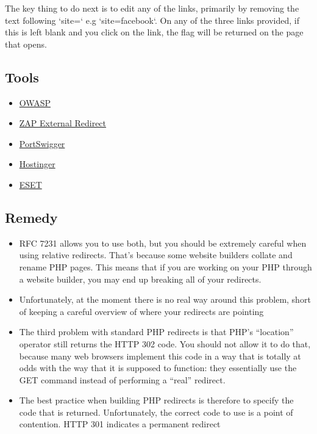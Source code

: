 The key thing to do next is to edit any of the links, primarily by removing the text following `site=` e.g `site=facebook`. On any of the three links provided, if this is left blank and you click on the link, the flag will be returned on the page that opens.


\subsection{Tools}

\begin{itemize}
    \item \href{https://cheatsheetseries.owasp.org/cheatsheets/Unvalidated_Redirects_and_Forwards_Cheat_Sheet.html}{OWASP}
    \item \href{https://www.zaproxy.org/docs/alerts/20019/}{ZAP External Redirect}
    \item \href{https://portswigger.net/kb/issues/00500100_open-redirection-reflected}{PortSwigger}
    \item \href{https://www.hostinger.com/tutorials/php-redirect}{Hostinger}
    \item \href{https://www.welivesecurity.com/2007/11/07/whats-a-redirect-and-why-is-it-bad/}{ESET}
\end{itemize}

\subsection{Remedy}

\begin{itemize}
    \item RFC 7231 allows you to use both, but you should be extremely careful when using relative redirects. That’s because some website builders collate and rename PHP pages. This means that if you are working on your PHP through a website builder, you may end up breaking all of your redirects.
    \item Unfortunately, at the moment there is no real way around this problem, short of keeping a careful overview of where your redirects are pointing
    \item The third problem with standard PHP redirects is that PHP’s “location” operator still returns the HTTP 302 code. You should not allow it to do that, because many web browsers implement this code in a way that is totally at odds with the way that it is supposed to function: they essentially use the GET command instead of performing a “real” redirect.
    \item The best practice when building PHP redirects is therefore to specify the code that is returned. Unfortunately, the correct code to use is a point of contention. HTTP 301 indicates a permanent redirect
\end{itemize}